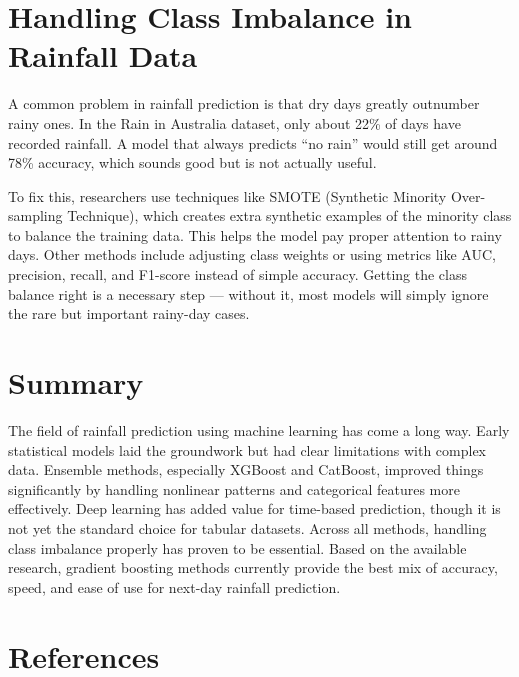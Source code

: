 \documentclass[12pt,a4paper]{article}
\begin{document}
\section*{Handling Class Imbalance in Rainfall Data}

A common problem in rainfall prediction is that dry days greatly outnumber rainy ones. In the Rain in Australia dataset, only about 22\% of days have recorded rainfall. A model that always predicts ``no rain'' would still get around 78\% accuracy, which sounds good but is not actually useful.

To fix this, researchers use techniques like SMOTE (Synthetic Minority Over-sampling Technique), which creates extra synthetic examples of the minority class to balance the training data. This helps the model pay proper attention to rainy days. Other methods include adjusting class weights or using metrics like AUC, precision, recall, and F1-score instead of simple accuracy. Getting the class balance right is a necessary step --- without it, most models will simply ignore the rare but important rainy-day cases.

\section*{Summary}

The field of rainfall prediction using machine learning has come a long way. Early statistical models laid the groundwork but had clear limitations with complex data. Ensemble methods, especially XGBoost and CatBoost, improved things significantly by handling nonlinear patterns and categorical features more effectively. Deep learning has added value for time-based prediction, though it is not yet the standard choice for tabular datasets. Across all methods, handling class imbalance properly has proven to be essential. Based on the available research, gradient boosting methods currently provide the best mix of accuracy, speed, and ease of use for next-day rainfall prediction.

\section*{References}
\end{document}
